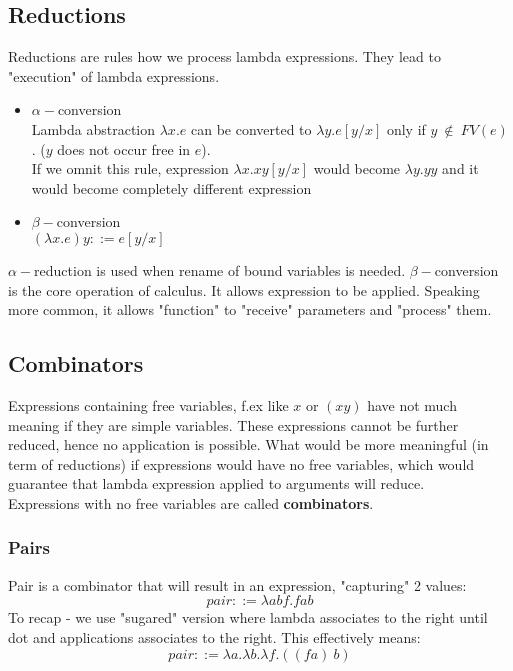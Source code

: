 \subsection{Reductions}
Reductions are rules how we process lambda expressions. They lead to "execution" of lambda expressions. 

\begin{itemize}
    \item $\alpha{-}$conversion
        \\
        Lambda abstraction $\lambda{x}.e$ can be converted to $\lambda{y}.e[y/x]$ only if $y\ \notin\ FV(e)$. ($y$ does not occur free in $e$).
        \\
        If we omnit this rule, expression $\lambda{x}.xy[y/x]$ would become $\lambda{y}.yy$ and it would become completely different expression

    \item $\beta{-}$conversion
        \\
        $(\lambda{x}.e)y ::= e[y/x]$
\end{itemize}

$\alpha{-}$reduction is used when rename of bound variables is needed. $\beta{-}$conversion is the core operation of \lam calculus. 
It allows expression to be applied. Speaking more common, it allows "function" to "receive" parameters and "process" them.

\subsection{Combinators}
Expressions containing free variables, f.ex like $x$ or $(xy)$ have not much meaning if they are simple variables. These expressions cannot be further reduced, hence
no application is possible. What would be more meaningful (in term of reductions) if expressions would have no free variables, which would guarantee that 
lambda expression applied to arguments will reduce.
\\
Expressions with no free variables are called \textbf{combinators}.

\subsubsection{Pairs}
Pair is a combinator that will result in an expression, "capturing" 2 values:
\[pair ::= \lambda{abf}.fab \]
To recap - we use "sugared" version where lambda associates to the right until dot and applications associates to the right. 
This effectively means:
\[pair ::= \lambda{a}.\lambda{b}.\lambda{f}.((f a)\ b) \]

